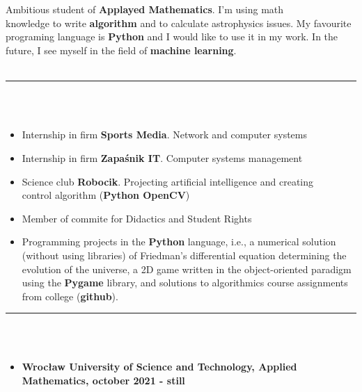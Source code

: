 \documentclass[10pt]{article}
\begin{document}
    \begin{minipage}[t]{0.60\textwidth}
        \fontsize{10pt}{10pt} \\ \\
        Ambitious student of \textbf{Applayed Mathematics}. I'm using math \\ knowledge to write \textbf{algorithm} and to calculate astrophysics issues.
        My favourite programing language is \textbf{Python} and I would like to use it in my work. In the future, I see myself in the field of \textbf{machine learning}. \\ \\
        \rule{11cm}{1pt} \\ \\
        \fontsize{10pt}{10pt}
        \begin{itemize}[leftmargin=*]
            \setlength{\parskip}{0pt}
            \item Internship in firm \textbf{Sports Media}. Network and computer systems 
            \item Internship in firm \textbf{Zapaśnik IT}. Computer systems management
            \item Science club \textbf{Robocik}. Projecting artificial intelligence and creating \\ control algorithm  (\textbf{Python OpenCV})
            \item Member of commite for Didactics and Student Rights
            \item Programming projects in the \textbf{Python} language, i.e., a numerical solution (without using libraries) of Friedman's differential equation determining the evolution of the universe, a 2D game written in the object-oriented paradigm using the \textbf{Pygame} library, and solutions to algorithmics course assignments from college (\textbf{github}).
        \end{itemize}
        \rule{11cm}{1pt} \\ \\
        \fontsize{10pt}{10pt}
        \begin{itemize}[leftmargin=*]
            \setlength{\parskip}{0pt}
            \item \textbf{Wrocław University of Science and Technology, Applied Mathematics, october 2021 - still}

\end{itemize}
\end{minipage}
\end{document}
